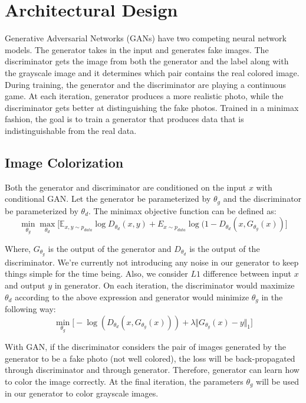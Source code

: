 \documentclass[oneside,a4paper,12pt]{report}
\begin{document}
\section{Architectural Design}
\hspace*{0.25 in}Generative Adversarial Networks (GANs) have two competing neural network models. The generator takes in the input and generates fake images. The discriminator gets the image from both the generator and the label along with the grayscale image and it determines which pair contains the real colored image. During training, the generator and the discriminator are playing a continuous game. At each iteration, generator produces a more realistic photo, while the discriminator gets better at distinguishing the fake photos. Trained in a minimax fashion, the goal is to train a generator that produces data that is indistinguishable from the real data.
	\subsection{Image Colorization}
	\hspace{0.4 in}Both the generator and discriminator are conditioned on the input $x$ with conditional GAN. Let the generator be parameterized by $\theta_g$ and the discriminator be parameterized by $\theta_d$. The minimax objective function can be defined as:
	\[
		\min_{\theta_g}\max_{\theta_d}\Big[\mathbb{E}_{x,y\sim p_{data}} \log D_{\theta_d}(x,y) + E_{x\sim p_{data}} \log(1 - D_{\theta_d}(x, G_{\theta_g}(x))\Big]
	\]

	Where, $G_{\theta_{g}}$ is the output of the generator and $D_{\theta_d}$ is the output of the discriminator.
	We're currently not introducing any noise in our generator to keep things simple for the time being. Also, we consider $L1$ difference between input $x$ and output $y$ in generator. On each iteration, the discriminator would maximize $\theta_d$ according to the above expression and generator would minimize $\theta_g$ in the following way:
	\[
		\min_{\theta_g}\Big[-\log(D_{\theta_d}(x,G_{\theta_g}(x)))+\lambda \Vert G_{\theta_g}(x) - y \Vert_1 \Big]
	\]

	With GAN, if the discriminator considers the pair of images generated by the generator to be a fake photo (not well colored), the loss will be back-propagated through discriminator and through generator. Therefore, generator can learn how to color the image correctly. At the final iteration, the parameters $\theta_g$ will be used in our generator to color grayscale images.
\end{document}
